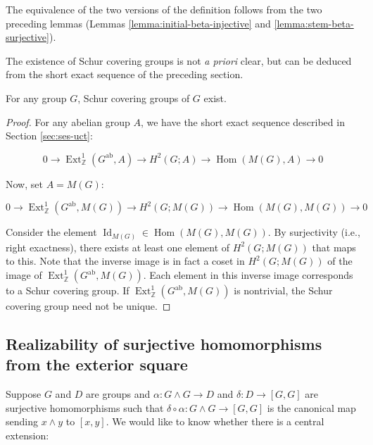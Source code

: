 \documentclass{ucetd}
\begin{document}
The equivalence of the two versions of the definition follows from the
two preceding lemmas (Lemmas \ref{lemma:initial-beta-injective} and
\ref{lemma:stem-beta-surjective}).

The existence of Schur covering groups is not {\em a priori} clear,
but can be deduced from the short exact sequence of the preceding
section. 

\begin{theorem}\label{thm:schur-covering-groups-exist}
  For any group $G$, Schur covering groups of $G$ exist.
\end{theorem}

\begin{proof}
  For any abelian group $A$, we have the short exact sequence
  described in Section \ref{sec:ses-uct}:

  \begin{equation*}
    0 \to \operatorname{Ext}^1_{\mathbb{Z}}(G^{\operatorname{ab}},A) \to H^2(G;A) \to \operatorname{Hom}(M(G),A) \to 0
  \end{equation*}
  
  Now, set $A = M(G)$:

  \begin{equation*}
    0 \to \operatorname{Ext}^1_{\mathbb{Z}}(G^{\operatorname{ab}},M(G)) \to H^2(G;M(G)) \to \operatorname{Hom}(M(G),M(G)) \to 0
  \end{equation*}
  
  Consider the element $\operatorname{Id}_{M(G)} \in
  \operatorname{Hom}(M(G),M(G))$. By surjectivity (i.e., right
  exactness), there exists at least one element of $H^2(G;M(G))$ that
  maps to this. Note that the inverse image is in fact a coset in
  $H^2(G;M(G))$ of the image of
  $\operatorname{Ext}^1_{\mathbb{Z}}(G^{\operatorname{ab}},M(G))$. Each
  element in this inverse image corresponds to a Schur covering
  group. If
  $\operatorname{Ext}^1_{\mathbb{Z}}(G^{\operatorname{ab}},M(G))$ is
  nontrivial, the Schur covering group need not be unique.
\end{proof}

\subsection{Realizability of surjective homomorphisms from the exterior square}

Suppose $G$ and $D$ are groups and $\alpha:G \wedge G \to D$ and
$\delta:D \to [G,G]$ are surjective homomorphisms such that $\delta
\circ \alpha:G \wedge G \to [G,G]$ is the canonical map sending $x
\wedge y$ to $[x,y]$. We would like to know whether there is a central
extension:
\end{document}
